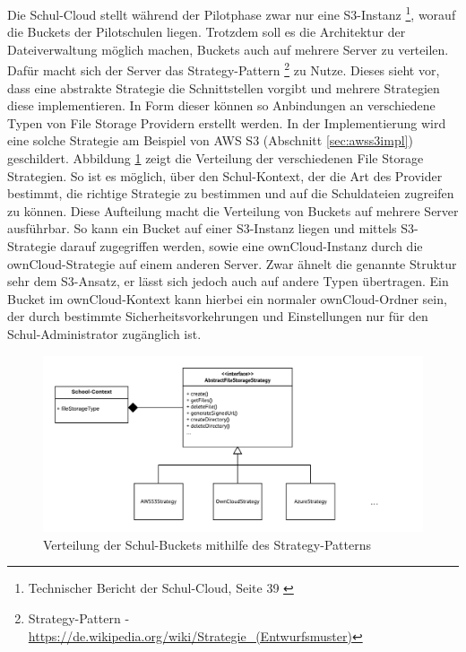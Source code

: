 Die Schul-Cloud stellt während der Pilotphase zwar nur eine S3-Instanz \footnote{Technischer Bericht der Schul-Cloud, Seite 39 \cite{paper:technischerbericht}}, worauf die Buckets der Pilotschulen liegen. Trotzdem soll es die Architektur der Dateiverwaltung möglich machen, Buckets auch auf mehrere Server zu verteilen. Dafür macht sich der Server das Strategy-Pattern \footnote{Strategy-Pattern - \url{https://de.wikipedia.org/wiki/Strategie_(Entwurfsmuster)}} zu Nutze. Dieses sieht vor, dass eine abstrakte Strategie die Schnittstellen vorgibt und mehrere Strategien diese implementieren. In Form dieser können so Anbindungen an verschiedene Typen von File Storage Providern erstellt werden. In der Implementierung wird eine solche Strategie am Beispiel von AWS S3 (Abschnitt \ref{sec:awss3impl}) geschildert. Abbildung \ref{fig:strategy} zeigt die Verteilung der verschiedenen File Storage Strategien. So ist es möglich, über den Schul-Kontext, der die Art des Provider bestimmt, die richtige Strategie zu bestimmen und auf die Schuldateien zugreifen zu können. Diese Aufteilung macht die Verteilung von Buckets auf mehrere Server ausführbar. So kann ein Bucket auf einer S3-Instanz liegen und mittels S3-Strategie darauf zugegriffen werden, sowie eine ownCloud-Instanz durch die ownCloud-Strategie auf einem anderen Server. Zwar ähnelt die genannte Struktur sehr dem S3-Ansatz, er lässt sich jedoch auch auf andere Typen übertragen. Ein Bucket im ownCloud-Kontext kann hierbei ein normaler ownCloud-Ordner sein, der durch bestimmte Sicherheitsvorkehrungen und Einstellungen nur für den Schul-Administrator zugänglich ist.

\begin{figure}[H]
	\centering
	\includegraphics[width=1\linewidth]{images/strategypattern}
	\caption[Caption for concept]{Verteilung der Schul-Buckets mithilfe des Strategy-Patterns}
	\label{fig:strategy}
\end{figure}

